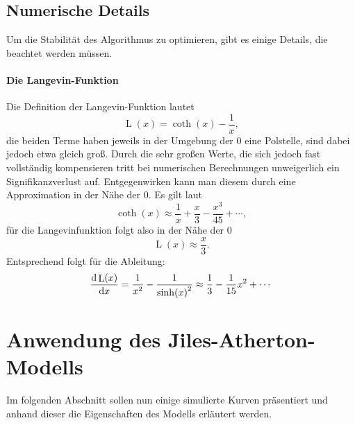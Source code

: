\documentclass{scrartcl}
\DeclareMathOperator{\Langevin}{L}
\begin{document}
\subsection{Numerische Details}
Um die Stabilität des Algorithmus zu optimieren, gibt es einige Details, die beachtet werden müssen.
\paragraph{Die Langevin-Funktion}
Die Definition der Langevin-Funktion lautet
\begin{equation}
	\Langevin(x) = \coth(x) - \frac{1}{x},
\end{equation}
die beiden Terme haben jeweils in der Umgebung der $0$ eine Polstelle, sind dabei jedoch etwa gleich groß. Durch die sehr großen Werte, die sich jedoch fast vollständig kompensieren tritt bei numerischen Berechnungen unweigerlich ein Signifikanzverlust auf. Entgegenwirken kann man diesem durch eine Approximation in der Nähe der $0$. Es gilt laut \cite{abramowitz}
\begin{equation}
	\coth(x) \approx \frac{1}{x} + \frac{x}{3} - \frac{x^3}{45} + \cdots,
\end{equation}
für die Langevinfunktion folgt also in der Nähe der $0$
\begin{equation}
	\Langevin(x) \approx \frac{x}{3}.
\end{equation}
Entsprechend folgt für die Ableitung:
\begin{equation}
	\frac{\dif \Langevin(x)}{\dif x} = \frac{1}{x^2} - \frac{1}{\sinh(x)^2} \approx \frac{1}{3} - \frac{1}{15}x^2 + \cdots
\end{equation}
\section{Anwendung des Jiles-Atherton-Modells}
Im folgenden Abschnitt sollen nun einige simulierte Kurven präsentiert und anhand dieser die Eigenschaften des Modells erläutert werden.
\begin{figure}[h]
\end{figure}
\end{document}
